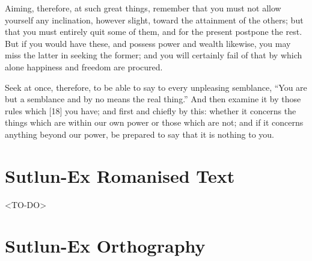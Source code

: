 \documentclass{book}
\begin{document}
    Aiming, therefore, at such great things, remember that you must not allow yourself any inclination,
    however slight, toward the attainment of the others; but that you must entirely quit some of them,
    and for the present postpone the rest. But if you would have these, and possess power and wealth likewise,
    you may miss the latter in seeking the former; and you will certainly fail of that by which alone
    happiness and freedom are procured.

    Seek at once, therefore, to be able to say to every unpleasing semblance, “You are but a semblance and by
    no means the real thing.” And then examine it by those rules which [18] you have; and first and chiefly by this:
    whether it concerns the things which are within our own power or those which are not; and if it concerns
    anything beyond our power, be prepared to say that it is nothing to you.

\section{Sutlun-Ex Romanised Text}

    <TO-DO>

\section{Sutlun-Ex Orthography}
\end{document}
